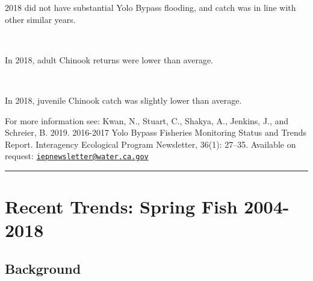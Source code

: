 \documentclass[
]{book}
\begin{document}
\begin{panel-grid}
\begin{columns-nocenter}
\begin{column800}
2018 did not have substantial Yolo Bypass flooding, and catch was in line with other similar years.

\end{column800}

\begin{column40}

~

\end{column40}

\begin{column800}

In 2018, adult Chinook returns were lower than average.

\end{column800}

\begin{column40}

~

\end{column40}

\begin{column800}

In 2018, juvenile Chinook catch was slightly lower than average.

\end{column800}

\end{columns-nocenter}

\end{panel-grid}

\begin{disclaimer}
For more information see: Kwan, N., Stuart, C., Shakya, A., Jenkins, J.,
and Schreier, B. 2019. 2016-2017 Yolo Bypass Fisheries Monitoring Status
and Trends Report. Interagency Ecological Program Newsletter, 36(1):
27--35. Available on request:
\href{mailto:iepnewsletter@water.ca.gov}{\nolinkurl{iepnewsletter@water.ca.gov}}
\end{disclaimer}

\begin{center}\rule{0.5\linewidth}{0.5pt}\end{center}

\hypertarget{recent-trends-spring-fish-2004-2018}{%
\section{Recent Trends: Spring Fish 2004-2018}\label{recent-trends-spring-fish-2004-2018}}

\hypertarget{background-5}{%
\subsection{Background}\label{background-5}}
\end{document}
